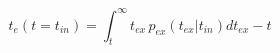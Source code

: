\begin{equation}
t_e(t=t_{in}) =\int_t^{\infty} t_{ex}\, p_{ex}(t_{ex}|t_{in}) dt_{ex} - t
\end{equation}